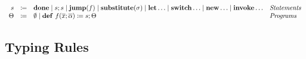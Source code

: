 \begin{definition}
    \[ 
      \begin{array}{r c l l}
        s & \coloneqq & \done \mid s ; s \mid \mathbf{jump}(f) \mid \mathbf{substitute}(\sigma) \mid \mathbf{let}\ldots \mid \mathbf{switch}\ldots \mid \mathbf{new}\ldots \mid \mathbf{invoke}\ldots & \emph{Statements}\\
        \Theta & \coloneqq & \emptyset \mid \defi{f(\overline{x};\overline{\alpha})}{s}; \Theta & \emph{Programs}\\
      \end{array}
    \]
\end{definition}

\subsection{Typing Rules}
\label{subsec:axcut:typing-rules}

\begin{prooftree}
\end{prooftree}

\begin{prooftree}
\end{prooftree}
